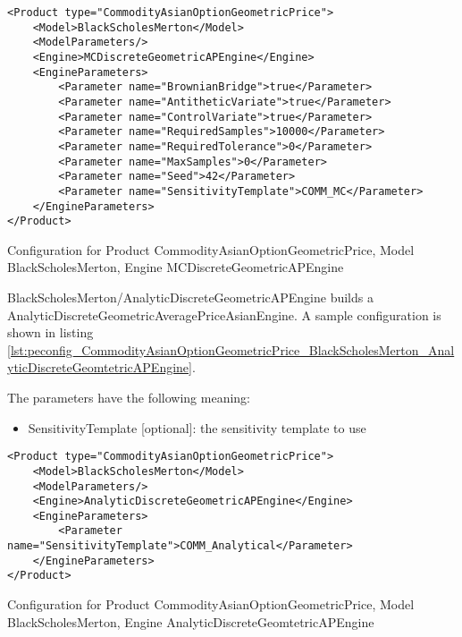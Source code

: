 \begin{longlisting}
\begin{verbatim}
<Product type="CommodityAsianOptionGeometricPrice">
    <Model>BlackScholesMerton</Model>
    <ModelParameters/>
    <Engine>MCDiscreteGeometricAPEngine</Engine>
    <EngineParameters>
        <Parameter name="BrownianBridge">true</Parameter>    
        <Parameter name="AntitheticVariate">true</Parameter>    
        <Parameter name="ControlVariate">true</Parameter>    
        <Parameter name="RequiredSamples">10000</Parameter>    
        <Parameter name="RequiredTolerance">0</Parameter>    
        <Parameter name="MaxSamples">0</Parameter>    
        <Parameter name="Seed">42</Parameter>    
        <Parameter name="SensitivityTemplate">COMM_MC</Parameter>
    </EngineParameters>
</Product>
\end{verbatim}
\caption{Configuration for Product CommodityAsianOptionGeometricPrice, Model BlackScholesMerton, Engine MCDiscreteGeometricAPEngine}
\label{lst:peconfig_CommodityAsianOptionGeometricPrice_BlackScholesMerton_MCDiscreteGeomtetricAPEngine}
\end{longlisting}

BlackScholesMerton/AnalyticDiscreteGeometricAPEngine builds a AnalyticDiscreteGeometricAveragePriceAsianEngine. A sample
configuration is shown in listing
\ref{lst:peconfig_CommodityAsianOptionGeometricPrice_BlackScholesMerton_AnalyticDiscreteGeomtetricAPEngine}.

The parameters have the following meaning:

\begin{itemize}
\item SensitivityTemplate [optional]: the sensitivity template to use 
\end{itemize}

\begin{longlisting}
\begin{verbatim}
<Product type="CommodityAsianOptionGeometricPrice">
    <Model>BlackScholesMerton</Model>
    <ModelParameters/>
    <Engine>AnalyticDiscreteGeometricAPEngine</Engine>
    <EngineParameters>
        <Parameter name="SensitivityTemplate">COMM_Analytical</Parameter>
    </EngineParameters>
</Product>
\end{verbatim}
\caption{Configuration for Product CommodityAsianOptionGeometricPrice, Model BlackScholesMerton, Engine AnalyticDiscreteGeomtetricAPEngine}
\label{lst:peconfig_CommodityAsianOptionGeometricPrice_BlackScholesMerton_AnalyticDiscreteGeomtetricAPEngine}
\end{longlisting}

